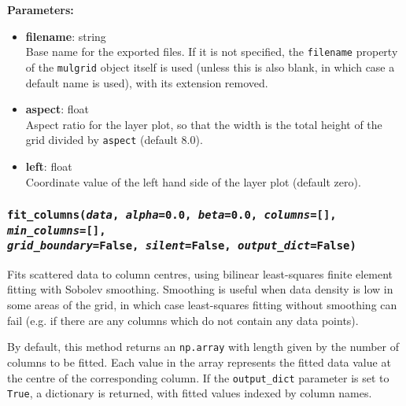 \textbf{Parameters:}
\begin{itemize}
\item \textbf{filename}: string\\
  Base name for the exported files.  If it is not specified, the \texttt{filename} property of the \texttt{mulgrid} object itself is used (unless this is also blank, in which case a default name is used), with its extension removed.
\item \textbf{aspect}: float\\
  Aspect ratio for the layer plot, so that the width is the total height of the grid divided by \texttt{aspect} (default 8.0).
\item \textbf{left}: float\\
  Coordinate value of the left hand side of the layer plot (default zero).
\end{itemize}

\begin{snugshade}\subsubsection{\texttt{fit\_columns(\emph{data}, \emph{alpha}=0.0, \emph{beta}=0.0, \emph{columns}=[], \emph{min\_columns}=[], \\
    \emph{grid\_boundary}=False, \emph{silent}=False, \emph{output\_dict}=False)}}\end{snugshade}
\label{sec:mulgrid:fit_columns}

Fits scattered data to column centres, using bilinear least-squares finite element fitting with Sobolev smoothing.  Smoothing is useful when data density is low in some areas of the grid, in which case least-squares fitting without smoothing can fail (e.g. if there are any columns which do not contain any data points).

By default, this method returns an \texttt{np.array} with length given by the number of columns to be fitted. Each value in the array represents the fitted data value at the centre of the corresponding column. If the \texttt{output\_dict} parameter is set to \texttt{True}, a dictionary is returned, with fitted values indexed by column names.

